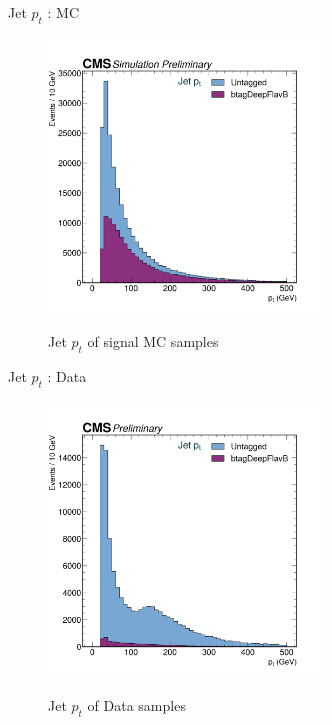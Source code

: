 \documentclass[10pt,xcolor=dvipsnames]{beamer}
\begin{document}
\begin{frame}[fragile]{Jet $p_t$ : MC }
  \begin{figure}
    \centering
    \includegraphics[width=0.65\textwidth]{../Kinematics/JetsMC.png}
    \label{JetMC}
    \caption{Jet $p_t$ of signal MC samples}
  \end{figure}  
  \end{frame}
  
  \begin{frame}[fragile]{Jet $p_t$ : Data}
  
    \begin{figure}
      \centering
      \includegraphics[width=0.65\textwidth]{../Kinematics/JetsData.png}
      \label{JetData}
      \caption{Jet $p_t$ of Data samples}
    \end{figure}  
  
  \end{frame}
\end{document}
